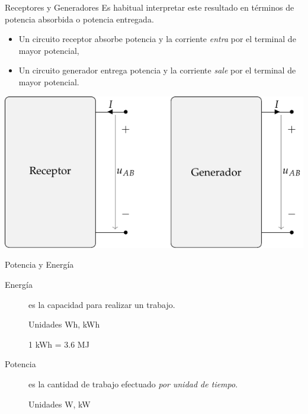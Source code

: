 \documentclass[xcolor={usenames,svgnames,dvipsnames}]{beamer}
\begin{document}
\begin{frame}[label={sec:org3658a79}]{Receptores y Generadores}
Es habitual \alert{interpretar} este resultado en términos de potencia absorbida o potencia entregada. 
\begin{itemize}
\item Un \alert{circuito receptor absorbe potencia} y la corriente \emph{entra} por el terminal de mayor potencial,
\item Un \alert{circuito generador entrega potencia} y la corriente \emph{sale} por el terminal de mayor potencial.
\end{itemize}

\begin{center}
\includegraphics[height=0.5\textheight]{figs/receptor_generador.pdf}
\end{center}
\end{frame}

\begin{frame}[label={sec:org88f897e}]{Potencia y Energía}
\begin{description}
\item[{Energía}] es la capacidad para realizar un trabajo.

Unidades Wh, kWh

1 kWh = 3.6 MJ

\item[{Potencia}] es la cantidad de trabajo efectuado \emph{por unidad de
tiempo}.

Unidades W, kW
\end{description}
\end{frame}
\end{document}
